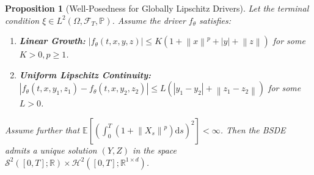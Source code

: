 \documentclass[qian]{imsart}
\newcommand{\R}{\mathbb{R}}
\newcommand{\Prob}{\mathbb{P}}
\newcommand{\E}{\mathbb{E}}
\newcommand{\Fcal}{\mathcal{F}}
\newcommand{\dd}{\mathrm{d}}
\newcommand{\norm}[1]{\left\lVert#1\right\rVert}
\newcommand{\abs}[1]{\left\lvert#1\right\rvert}
\theoremstyle{plain}
\newtheorem{proposition}[theorem]{Proposition}
\theoremstyle{definition}
\begin{document}
\begin{proposition}[Well-Posedness for Globally Lipschitz Drivers]
\label{prop:wellposed_lipschitz_driver}
Let the terminal condition $\xi \in L^2(\Omega, \Fcal_T, \Prob)$. Assume the driver $f_\theta$ satisfies:
\begin{enumerate}[label=(\alph*)]
    \item \textbf{Linear Growth:} $\abs{f_\theta(t,x,y,z)} \le K(1+\norm{x}^p+\abs{y}+\norm{z})$ for some $K>0, p \ge 1$.
    \item \textbf{Uniform Lipschitz Continuity:} $\abs{f_\theta(t,x,y_1,z_1)-f_\theta(t,x,y_2,z_2)} \le L(\abs{y_1-y_2}+\norm{z_1-z_2})$ for some $L>0$.
\end{enumerate}
Assume further that $\E\left[\left(\int_0^T (1+\norm{X_s}^p) \dd s\right)^2\right] < \infty$.
Then the BSDE admits a unique solution $(Y,Z)$ in the space $\mathcal{S}^2([0,T]; \R) \times \mathcal{H}^2([0,T]; \R^{1 \times d})$.
\end{proposition}
\end{document}
